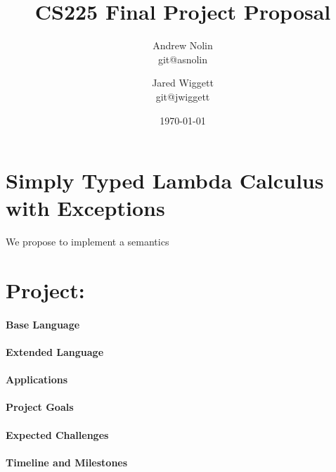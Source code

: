\documentclass{article}
\title{CS225 Final Project Proposal}
\author{Andrew Nolin \\ git@asnolin \and Jared Wiggett \\ git@jwiggett}
\date{\today}
\begin{document}
\maketitle
\section*{Simply Typed Lambda Calculus with Exceptions}
We propose to implement a semantics 

\section*{Project: }

\paragraph{Base Language}

\paragraph{Extended Language}

\paragraph{Applications}

\paragraph{Project Goals}

\paragraph{Expected Challenges}

\paragraph{Timeline and Milestones}
\end{document}
